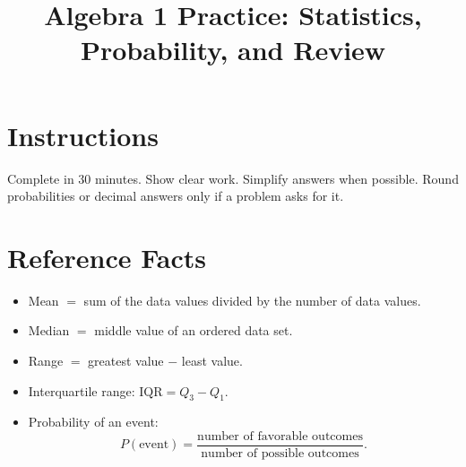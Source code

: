 \documentclass[12pt]{article}
\title{Algebra 1 Practice: Statistics, Probability, and Review}
\author{}
\date{}
\begin{document}
\maketitle

\section*{Instructions}
Complete in 30 minutes. Show clear work. Simplify answers when possible. Round probabilities or decimal answers only if a problem asks for it.

\section*{Reference Facts}
\begin{itemize}[leftmargin=1.5em]
  \item Mean $=$ sum of the data values divided by the number of data values.
  \item Median $=$ middle value of an ordered data set.
  \item Range $=$ greatest value $-$ least value.
  \item Interquartile range: $\mathrm{IQR}=Q_3-Q_1$.
  \item Probability of an event:
  \[
  P(\text{event})=\frac{\text{number of favorable outcomes}}{\text{number of possible outcomes}}.
  \]
\end{itemize}
\end{document}
